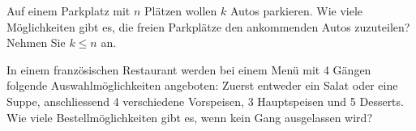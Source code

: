 \begin{comment}
\begin{solution*}
	\phantom{text}
	\begin{tasks}(3)
		\task $\dfrac{6!}{3!}=120$
		\task $\dfrac{6!}{1!}=720$
		\task $\dfrac{6!}{0!}=720$
	\end{tasks}
\end{solution*}
\end{comment}
\begin{exercise}
	Auf einem Parkplatz mit $n$ Plätzen wollen $k$ Autos parkieren.
	Wie viele Möglichkeiten gibt es, die freien Parkplätze den ankommenden Autos zuzuteilen? Nehmen Sie $k\leq n$ an.
\end{exercise}
\begin{comment}
\begin{solution*}
	\phantom{text}
	Es gibt $\dfrac{n!}{\left(n-k\right)!}$ Möglichkeiten.
\end{solution*}
\end{comment}
\begin{exercise}
	In einem französischen Restaurant werden bei einem Menü mit 4 Gängen folgende Auswahlmöglichkeiten angeboten:
	Zuerst entweder ein Salat oder eine Suppe, anschliessend 4 verschiedene Vorspeisen, 3 Hauptspeisen und 5 Desserts.
	Wie viele Bestellmöglichkeiten gibt es, wenn kein Gang ausgelassen wird?
\end{exercise}
\begin{comment}
\begin{solution*}
	Tatsächlich braucht man hier keine Fakultät.
	Die Anzahl der Bestellmöglchkeiten ist
	\begin{equation*}
		2\cdot 4\cdot 3\cdot 5=120.
	\end{equation*}
\end{solution*}
\end{comment}